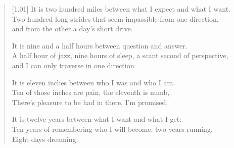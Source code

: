 \begin{verse}[1.01\textwidth]
It is two hundred miles between what I expect and what I want.\\
Two hundred long strides that seem impassible from one direction,\\
\vin and from the other a day's short drive.

It is nine and a half hours between question and answer.\\
A half hour of jazz, nine hours of sleep, a scant second of perspective,\\
\vin and I can only traverse in one direction

It is eleven inches between who I was and who I am.\\
Ten of those inches are pain, the eleventh is numb,\\
\vin There's pleasure to be had in there, I'm promised.

It is twelve years between what I want and what I get:\\
Ten years of remembering who I will become, two years running,\\
\vin Eight days dreaming.
\end{verse}
\newpage

